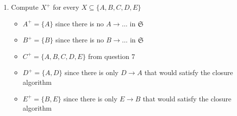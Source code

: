 \documentclass[12pt]{article}
\begin{document}
\begin{enumerate}
  \item Compute $X^+$ for every $X \subseteq \{A, B, C, D, E\}$
        \begin{itemize}
          \item $A^+ = \{A\}$ since there is no $A \longrightarrow \dots$ in
                $\mathfrak{S}$
          \item $B^+ = \{B\}$ since there is no $B \longrightarrow \dots$ in
                $\mathfrak{S}$
          \item $C^+ = \{A, B, C, D, E\}$ from question 7
          \item $D^+ = \{A, D\}$ since there is only $D \longrightarrow A$ that
                would satisfy the closure algorithm
          \item $E^+ = \{B, E\}$ since there is only $E \longrightarrow B$ that
                would satisfy the closure algorithm
        \end{itemize}
  \ \\


\end{enumerate}
\end{document}
